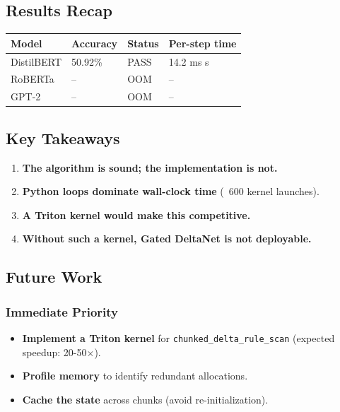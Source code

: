 \subsection{Results Recap}

\begin{table}[H]
\centering
\small
\begin{tabular}{llll}
\toprule
\textbf{Model} & \textbf{Accuracy} & \textbf{Status} & \textbf{Per-step time} \\
\midrule
DistilBERT & 50.92\% & PASS & 14.2 ms s \\
RoBERTa & -- & OOM & -- \\
GPT-2 & -- & OOM & -- \\
\bottomrule
\end{tabular}
\end{table}

\subsection{Key Takeaways}

\begin{enumerate}
\item \textbf{The algorithm is sound; the implementation is not.}
\item \textbf{Python loops dominate wall-clock time} (~600 kernel launches).
\item \textbf{A Triton kernel would make this competitive.}
\item \textbf{Without such a kernel, Gated DeltaNet is not deployable.}

\end{enumerate}
\subsection{Future Work}

\subsubsection{Immediate Priority}

\begin{itemize}
\item \textbf{Implement a Triton kernel} for \texttt{chunked\_delta\_rule\_scan} (expected
  speedup: 20-50$\times$).
\item \textbf{Profile memory} to identify redundant allocations.
\item \textbf{Cache the state} across chunks (avoid re-initialization).

\end{itemize}
